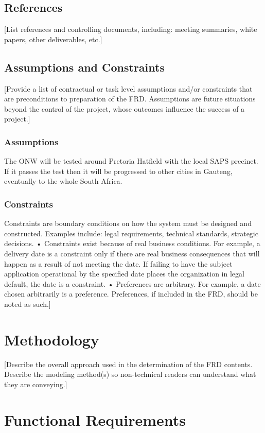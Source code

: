 \documentclass[a4paper,12pt]{article}
\begin{document}
\subsection{References}
[List references and controlling documents, including: meeting summaries, white papers, other deliverables, etc.]
\subsection{Assumptions and Constraints}
[Provide a list of contractual or task level assumptions and/or constraints that are preconditions to preparation of the FRD.  Assumptions are future situations beyond the control of the project, whose outcomes influence the success of a project.]
\subsubsection{Assumptions}
The ONW will be tested around Pretoria Hatfield with the local SAPS precinct. If it passes the test then it will be progressed to other cities in Gauteng, eventually to the whole South Africa. 
\subsubsection{Constraints}
Constraints are boundary conditions on how the system must be designed and constructed.  Examples include: legal requirements, technical standards, strategic decisions. 
•	Constraints exist because of real business conditions.  For example, a delivery date is a constraint only if there are real business consequences that will happen as a result of not meeting the date.  If failing to have the subject application operational by the specified date places the organization in legal default, the date is a constraint.
•	Preferences are arbitrary.  For example, a date chosen arbitrarily is a preference.  Preferences, if included in the FRD, should be noted as such.]%

\section{Methodology}
[Describe the overall approach used in the determination of the FRD contents.  Describe the modeling method(s) so non-technical readers can understand what they are conveying.]

\section{Functional Requirements}
\end{document}
